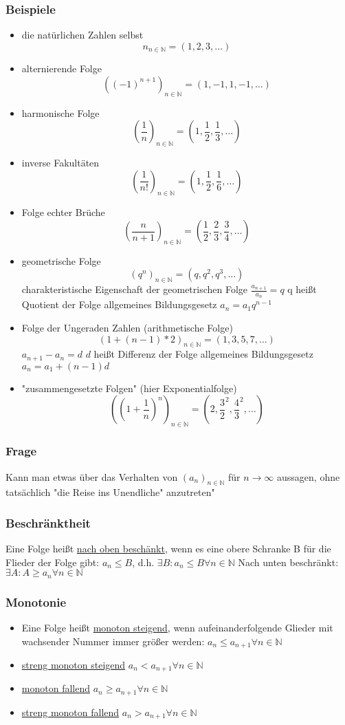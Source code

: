 \documentclass[a4paper]{scrartcl}
\DeclareMathOperator{\Forall}{\forall}
\begin{document}
\subsubsection{Beispiele}
\label{sec-3-1-2}
\begin{itemize}
\item die natürlichen Zahlen selbst \[n_{n\in \mathbb{N}} = (1, 2, 3, \ldots)\]
\item alternierende Folge \[((-1)^{n+1})_{n\in \mathbb{N}} = (1, -1, 1, -1, \ldots)\]
\item harmonische Folge \[(\frac{1}{n})_{n\in \mathbb{N}} = (1, \frac{1}{2}, \frac{1}{3}, \ldots)\]
\item inverse Fakultäten \[(\frac{1}{n!})_{n\in \mathbb{N}}= (1, \frac{1}{2}, \frac{1}{6}, \ldots)\]
\item Folge echter Brüche \[(\frac{n}{n + 1})_{n\in \mathbb{N}} = (\frac{1}{2}, \frac{2}{3}, \frac{3}{4}, \ldots)\]
\item geometrische Folge \[(q^n)_{n\in \mathbb{N}} = (q, q^2,q^3, \ldots)\]
charakteristische Eigenschaft der geometrischen Folge $\frac{a_{n+1}}{a_n} = q$ q heißt Quotient der Folge
allgemeines Bildungsgesetz $a_n = a_1 q^{n-1}$
\item Folge der Ungeraden Zahlen (arithmetische Folge) \[(1+(n-1)*2)_{n\in \mathbb{N}} = (1, 3, 5, 7, \ldots)\]
$a_{n+1} - a_n = d$ $d$ heißt Differenz der Folge
allgemeines Bildungsgesetz $a_n = a_1 + (n - 1) d$
\item "zusammengesetzte Folgen" (hier Exponentialfolge) \[((1 + \frac{1}{n})^n)_{n\in \mathbb{N}} = (2, \frac{3}{2}^2, \frac{4}{3}^2, \ldots)\]
\end{itemize}
\subsubsection{Frage}
\label{sec-3-1-3}
Kann man etwas über das Verhalten von $(a_n)_{n\in \mathbb{N}}$ für $n \to \infty$ aussagen, ohne tatsächlich "die Reise ins Unendliche" anzutreten"
\subsubsection{Beschränktheit}
\label{sec-3-1-4}
Eine Folge heißt \uline{nach oben beschänkt}, wenn es eine obere Schranke B für die Flieder der Folge gibt: $a_n \leq B$, d.h. $\exists B: a_n \leq B \Forall n \in \mathbb{N}$
Nach unten beschränkt: $\exists A: A \geq a_n \Forall n\in\mathbb{N}$
\subsubsection{Monotonie}
\label{sec-3-1-5}
\begin{itemize}
\item Eine Folge heißt \uline{monoton steigend}, wenn aufeinanderfolgende Glieder mit wachsender Nummer immer größer werden: $a_n \leq a_{n+1} \Forall n\in\mathbb{N}$
\item \uline{streng monoton steigend} $a_n < a_{n+1} \Forall n\in\mathbb{N}$
\item \uline{monoton fallend} $a_n \geq a_{n+1} \Forall n\in\mathbb{N}$
\item \uline{streng monoton fallend} $a_n > a_{n+1} \Forall n\in\mathbb{N}$
\end{itemize}
\end{document}
